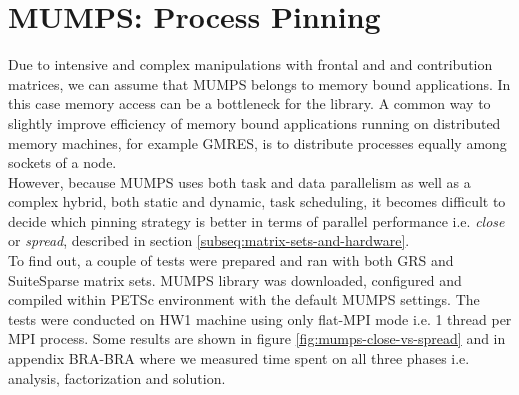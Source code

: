 \section{MUMPS: Process Pinning}
\label{subseq:mm-mumps-process-pinning}

Due to intensive and complex manipulations with frontal and and contribution matrices, we can assume that MUMPS belongs to memory bound applications. In this case memory access can be a bottleneck for the library. A common way to slightly improve efficiency of memory bound applications running on distributed memory machines, for example GMRES, is to distribute processes equally among sockets of  a node.\\


However, because MUMPS uses both task and data parallelism as well as a complex hybrid, both static and dynamic, task scheduling, it becomes difficult to decide which pinning strategy is better in terms of parallel performance i.e. \textit{close} or \textit{spread}, described in section \ref{subseq:matrix-sets-and-hardware}.\\


To find out, a couple of tests were prepared and ran with both GRS and SuiteSparse matrix sets. MUMPS library was downloaded, configured and compiled within PETSc environment with the default MUMPS settings. The tests were conducted on HW1  machine using only flat-MPI mode i.e. 1 thread per MPI process. Some results are shown in figure \ref{fig:mumps-close-vs-spread} and in appendix BRA-BRA where we measured time spent on all three phases i.e. analysis, factorization and solution.\\


